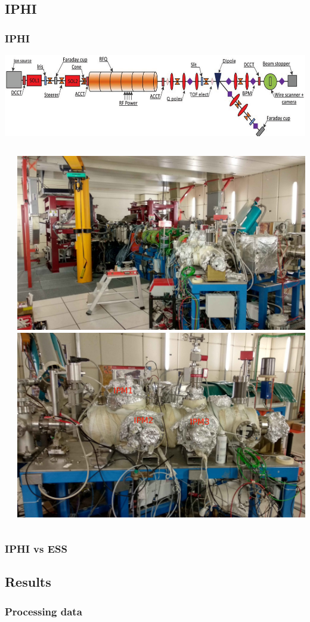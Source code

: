 \subsection{IPHI}
\begin{frame}
  \frametitle{IPHI}
  \includegraphics[width=1\textwidth]{04_Test/fig/fig000_IPHI_view.png}
  \begin{columns}
    \begin{column}{0.45\textwidth}
      
    \end{column}
    \begin{column}{0.45\textwidth}
      \includegraphics[width=1\textwidth]{04_Test/fig/fig000_IPHI_tb1.jpg}
      \includegraphics[width=1\textwidth]{04_Test/fig/fig000_IPHI_tb2.jpg}

    \end{column}
  \end{columns}

\end{frame}

\begin{frame}
  \frametitle{IPHI vs ESS}
\end{frame}

\subsection{Results}
\begin{frame}
  \frametitle{Processing data}
\end{frame}